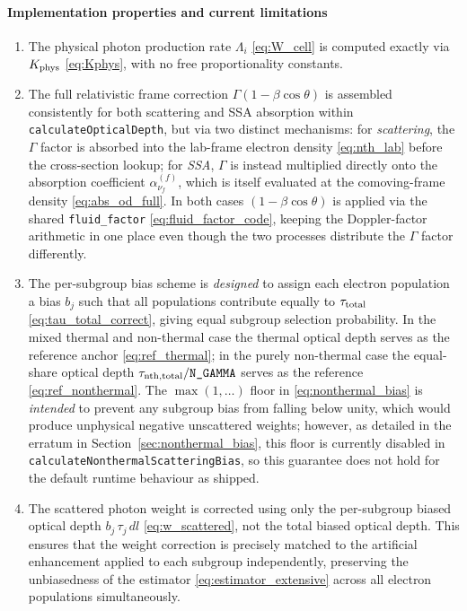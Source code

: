 \documentclass[12pt,a4paper]{article}
\newcommand{\nuf}{\nu_{\!f}}
\newcommand{\code}[1]{\texttt{#1}}
\begin{document}
\paragraph{Implementation properties and current limitations}

\begin{enumerate}
	\item The physical photon production rate $\Lambda_i$ \eqref{eq:W_cell}
	is computed exactly via $K_{\rm phys}$ \eqref{eq:Kphys}, with no free
	proportionality constants.
	
	\item The full relativistic frame correction $\Gamma(1-\beta\cos\theta)$
	\citep{abramowicz1991} is assembled consistently for both scattering and
	SSA absorption within \code{calculateOpticalDepth}, but via two
	distinct mechanisms: for \emph{scattering}, the $\Gamma$ factor is
	absorbed into the lab-frame electron density
	\eqref{eq:nth_lab} before the cross-section lookup; for \emph{SSA},
	$\Gamma$ is instead multiplied directly onto the absorption
	coefficient $\alpha_{\nuf}^{(f)}$, which is itself evaluated at the
	comoving-frame density \eqref{eq:abs_od_full}. In both cases
	$(1-\beta\cos\theta)$ is applied via the shared \code{fluid\_factor}
	\eqref{eq:fluid_factor_code}, keeping the Doppler-factor arithmetic
	in one place even though the two processes distribute the $\Gamma$
	factor differently.
	
	\item The per-subgroup bias scheme is \emph{designed} to assign each
	electron population a bias $b_j$ such that all populations contribute
	equally to $\tau_{\rm total}$ \eqref{eq:tau_total_correct}, giving equal
	subgroup selection probability. In the mixed thermal and non-thermal
	case the thermal optical depth serves as the reference anchor
	\eqref{eq:ref_thermal}; in the purely non-thermal case the equal-share
	optical depth $\tau_{\rm nth,total}/\code{N\_GAMMA}$ serves as the
	reference \eqref{eq:ref_nonthermal}. The $\max(1,\ldots)$ floor in
	\eqref{eq:nonthermal_bias} is \emph{intended} to prevent any subgroup
	bias from falling below unity, which would produce unphysical negative
	unscattered weights; however, as detailed in the erratum in
	Section~\ref{sec:nonthermal_bias}, this floor is currently disabled in
	\code{calculateNonthermalScatteringBias}, so this guarantee does not
	hold for the default runtime behaviour as shipped.
	
	\item The scattered photon weight is corrected using only the
	per-subgroup biased optical depth $b_j\,\tau_j\,dl$
	\eqref{eq:w_scattered}, not the total biased optical depth.  This
	ensures that the weight correction is precisely matched to the
	artificial enhancement applied to each subgroup independently,
	preserving the unbiasedness of the estimator \eqref{eq:estimator_extensive}
	across all electron populations simultaneously.
	

\end{enumerate}
\end{document}

